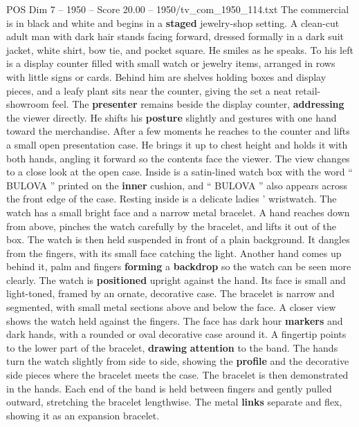 \begin{textsample}{POS Dim 7 – 1950 – Score 20.00 – 1950/tv\_com\_1950\_114.txt}  \label{ex:f7_pos_004}
The commercial is in black and white and begins in a \textbf{staged} jewelry-shop setting.
A clean-cut adult man with dark hair stands facing forward, dressed formally in a dark suit jacket, white shirt, bow tie, and pocket square.
He smiles as he speaks.
To his left is a display counter filled with small watch or jewelry items, arranged in rows with little signs or cards.
Behind him are shelves holding boxes and display pieces, and a leafy plant sits near the counter, giving the set a neat retail-showroom feel.
The \textbf{presenter} remains beside the display counter, \textbf{addressing} the viewer directly.
He shifts his \textbf{posture} slightly and gestures with one hand toward the merchandise.
After a few moments he reaches to the counter and lifts a small open presentation case.
He brings it up to chest height and holds it with both hands, angling it forward so the contents face the viewer.
The view changes to a close look at the open case.
Inside is a satin-lined watch box with the word “ BULOVA ” printed on the \textbf{inner} cushion, and “ BULOVA ” also appears across the front edge of the case.
Resting inside is a delicate ladies ’ wristwatch.
The watch has a small bright face and a narrow metal bracelet.
A hand reaches down from above, pinches the watch carefully by the bracelet, and lifts it out of the box.
The watch is then held suspended in front of a plain background.
It dangles from the fingers, with its small face catching the light.
Another hand comes up behind it, palm and fingers \textbf{forming} a \textbf{backdrop} so the watch can be seen more clearly.
The watch is \textbf{positioned} upright against the hand.
Its face is small and light-toned, framed by an ornate, decorative case.
The bracelet is narrow and segmented, with small metal sections above and below the face.
A closer view shows the watch held against the fingers.
The face has dark hour \textbf{markers} and dark hands, with a rounded or oval decorative case around it.
A fingertip points to the lower part of the bracelet, \textbf{drawing} \textbf{attention} to the band.
The hands turn the watch slightly from side to side, showing the \textbf{profile} and the decorative side pieces where the bracelet meets the case.
The bracelet is then demonstrated in the hands.
Each end of the band is held between fingers and gently pulled outward, stretching the bracelet lengthwise.
The metal \textbf{links} separate and flex, showing it as an expansion bracelet.

\end{textsample}
